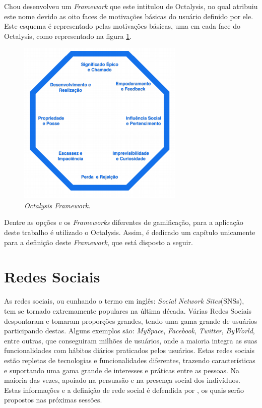 Chou desenvolveu um \textit{Framework} que este intitulou de Octalysis, no qual atribuiu
este nome devido as oito faces de motivações básicas do usuário definido por ele.
Este esquema é representado pelas motivações básicas, uma em cada face do Octalysis,
como representado na figura \ref{fig:octalysisex}.

\begin{figure}[h]
    \centering
    \includegraphics[width=300px, scale=1]{figuras/octalysisex}
    \caption{\textit{Octalysis Framework.}}
    \label{fig:octalysisex}
\end{figure}

Dentre as opções e os \textit{Frameworks} diferentes de gamificação, para a aplicação
deste trabalho é utilizado o Octalysis. Assim, é dedicado um capítulo
unicamente para a definição deste \textit{Framework}, que está disposto a seguir.



\section{Redes Sociais}
\label{sec:redessociais}
As redes sociais, ou cunhando o termo em inglês: \textit{Social} \textit{Network} \textit{Sites}(SNSs),
tem se tornado extremamente populares na última década. 
Várias
Redes Sociais despontaram e tomaram proporções grandes, tendo uma gama grande
de usuários participando destas. Alguns exemplos são: \textit{MySpace}, \textit{Facebook}, \textit{Twitter},
\textit{ByWorld}, entre outras, que conseguiram milhões de usuários, onde a maioria integra
as suas funcionalidades com hábitos diários praticados pelos usuários.
Estas redes sociais estão repletas de tecnologias e funcionalidades diferentes,
trazendo características e suportando uma gama grande de interesses e práticas
entre as pessoas. Na maioria das vezes, apoiado na persuasão e na presença social
dos indivíduos. Estas informações e a definição de rede social é defendida por
\cite{socialnetworkdefinition}, os quais serão propostos nas próximas sessões.

